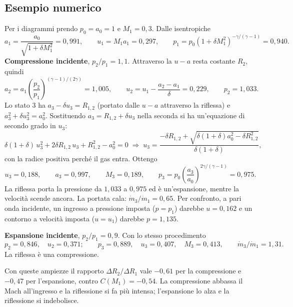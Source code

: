 \documentclass[11pt,a4paper]{article}
\newcommand{\Ru}{R_1}
\newcommand{\Rd}{R_2}
\newcommand{\uma}{u-a}
\newcommand{\Cr}{C}
\begin{document}
\subsection{Esempio numerico}
Per i diagrammi prendo $p_0=a_0=1$ e $M_1=0{,}3$. Dalle isentropiche
\[
  a_1=\frac{a_0}{\sqrt{1+\delta M_1^2}}=0{,}991,\qquad u_1=M_1a_1=0{,}297,\qquad
  p_1=p_0\left(1+\delta M_1^2\right)^{-\gamma/(\gamma-1)}=0{,}940 .
\]
\textbf{Compressione incidente}, $p_2/p_1=1{,}1$. Attraverso la $\uma$ resta costante $\Rd$, quindi
\[
  a_2=a_1\left(\frac{p_2}{p_1}\right)^{(\gamma-1)/(2\gamma)}=1{,}005,\qquad u_2=u_1-\frac{a_2-a_1}{\delta}=0{,}229,
  \qquad p_2=1{,}033 .
\]
Lo stato 3 ha $a_3-\delta u_3=R_{1,2}$ (portato dalle $\uma$ attraverso la riflessa) e $a_3^2+\delta u_3^2=a_0^2$.
Sostituendo $a_3=R_{1,2}+\delta u_3$ nella seconda si ha un'equazione di secondo grado in $u_3$:
\[
  \delta(1+\delta)\,u_3^2+2\delta R_{1,2}\,u_3+R_{1,2}^2-a_0^2=0\;\Longrightarrow\;
  u_3=\frac{-\delta R_{1,2}+\sqrt{\delta(1+\delta)a_0^2-\delta R_{1,2}^2}}{\delta(1+\delta)} ,
\]
con la radice positiva perché il gas entra. Ottengo
\[
  u_3=0{,}188,\qquad a_3=0{,}997,\qquad M_3=0{,}189,\qquad p_3=p_0\left(\frac{a_3}{a_0}\right)^{2\gamma/(\gamma-1)}=0{,}975 .
\]
La riflessa porta la pressione da $1{,}033$ a $0{,}975$ ed è un'espansione, mentre la velocità scende ancora. La
portata cala: $\dot m_3/\dot m_1=0{,}65$. Per confronto, a pari onda incidente, un ingresso a pressione imposta
($p=p_1$) darebbe $u=0{,}162$ e un contorno a velocità imposta ($u=u_1$) darebbe $p=1{,}135$.

\textbf{Espansione incidente}, $p_2/p_1=0{,}9$. Con lo stesso procedimento
\[
  p_2=0{,}846,\quad u_2=0{,}371;\qquad p_3=0{,}889,\quad u_3=0{,}407,\quad M_3=0{,}413,\qquad
  \dot m_3/\dot m_1=1{,}31 .
\]
La riflessa è una compressione.

Con queste ampiezze il rapporto $\Delta\Rd/\Delta\Ru$ vale $-0{,}61$ per la compressione e $-0{,}47$ per
l'espansione, contro $\Cr(M_1)=-0{,}54$. La compressione abbassa il Mach all'ingresso e la riflessione si fa più
intensa; l'espansione lo alza e la riflessione si indebolisce.

\end{document}

